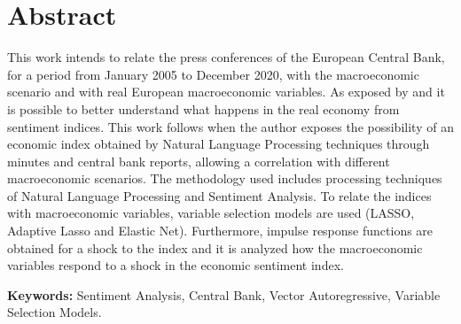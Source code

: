 
\chapter*{Abstract}
This work intends to relate the press conferences of the European Central Bank, for a period from January 2005 to December 2020, with the macroeconomic scenario and with real European macroeconomic variables. As exposed by \cite[]{shapiro2020measuring, shapiro2021taking} and \cite[]{barsky2012information} it is possible to better understand what happens in the real economy from sentiment indices. This work follows \cite{shapiro2020measuring} when the author exposes the possibility of an economic index obtained by Natural Language Processing techniques through minutes and central bank reports, allowing a correlation with different macroeconomic scenarios. The methodology used includes processing techniques of Natural Language Processing and Sentiment Analysis. To relate the indices with macroeconomic variables, variable selection models are used (LASSO, Adaptive Lasso and Elastic Net). Furthermore, impulse response functions are obtained for a shock to the index and it is analyzed how the macroeconomic variables respond to a shock in the economic sentiment index.
\par
\vspace{0.5in}    
    
\noindent
{\bf Keywords:} Sentiment Analysis, Central Bank, Vector Autoregressive, Variable Selection Models.



  